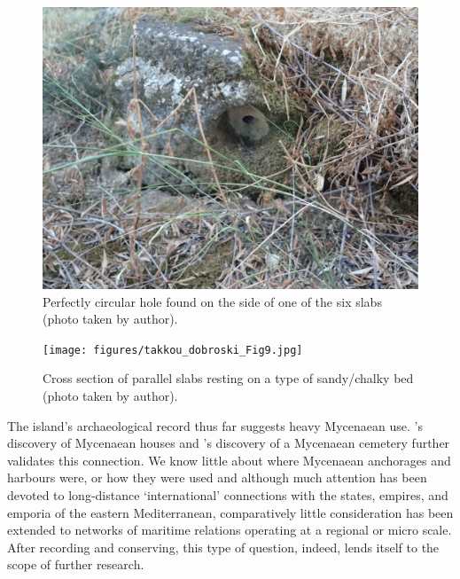 \begin{figure}[!p]
	\includegraphics[width=.9\linewidth]{figures/takkou_dobroski_Fig8.jpg}
	\centering
	\caption{Perfectly circular hole found on the side of one of the six slabs (photo taken by author).}
	\label{fig:Takkou_Fig8}
\end{figure}

\begin{figure}[!htb]
	\texttt{[image: figures/takkou\_dobroski\_Fig9.jpg]}
	\centering
	\caption{Cross section of parallel slabs resting on a type of sandy/chalky bed (photo taken by author).}
	\label{fig:Takkou_Fig9}
\end{figure}


\noindent The island’s archaeological record thus far suggests heavy Mycenaean use. \textcite{Benton_1933}'s discovery of Mycenaean houses and \textcite{Agallopoulou_1973}'s discovery of a Mycenaean cemetery further validates this connection. We know little about where Mycenaean anchorages and harbours were, or how they were used \parencite[1]{Tartaron_2013} and although much attention has been devoted to long-distance ‘international’ connections with the states, empires, and emporia of the eastern Mediterranean, comparatively little consideration has been extended to networks of maritime relations operating at a regional or micro scale. After recording and conserving, this type of question, indeed, lends itself to the scope of further research.


